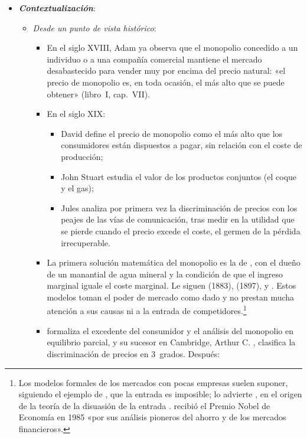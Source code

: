 \documentclass[11pt]{article}
\begin{document}
\begin{itemize}
\item \textbf{\emph{Contextualización}}:
  \begin{itemize}
  \item \emph{Desde un punto de vista histórico}:
  \begin{itemize}
  \item En el siglo XVIII, Adam \textcite{Smith1776Wealth} ya observa que el monopolio concedido a un individuo o a una compañía comercial mantiene el mercado desabastecido para vender muy por encima del precio natural: «el precio de monopolio es, en toda ocasión, el más alto que se puede obtener» (libro~I, cap.~VII).
  \item En el siglo XIX:
    \begin{itemize}
    \item David \textcite{Ricardo1817Principles} define el precio de monopolio como el más alto que los consumidores están dispuestos a pagar, sin relación con el coste de producción;
    \item John Stuart \textcite{Mill1848Principles} estudia el valor de los productos conjuntos (el coque y el gas);
    \item Jules \textcite{Dupuit1849Peages} analiza por primera vez la discriminación de precios con los peajes de las vías de comunicación\nocite{Ekelund1970Price}, tras medir en \textcite{Dupuit1844Mesure} la utilidad que se pierde cuando el precio excede el coste, el germen de la pérdida irrecuperable.
    \end{itemize}
  \item La primera solución matemática del monopolio es la de \textcite{Cournot1838Recherches}, con el dueño de un manantial de agua mineral y la condición de que el ingreso marginal iguale el coste marginal. Le siguen  (1883),  (1897), \textcite{Hotelling1929Stability} y \textcite{Robinson1933Economics}. Estos modelos toman el poder de mercado como dado y no prestan mucha atención a sus causas ni a la entrada de competidores.\footnote{Los modelos formales de los mercados con pocas empresas suelen suponer, siguiendo el ejemplo de , que la entrada es imposible; lo advierte \textcite{Modigliani1958New}, en el origen de la teoría de la disuasión de la entrada .  recibió el Premio Nobel de Economía en 1985 «por sus análisis pioneros del ahorro y de los mercados financieros»\nocite{Nobel1985Modigliani}.}
  \item \textcite{Marshall1890Principles} formaliza el excedente del consumidor y el análisis del monopolio en equilibrio parcial, y su sucesor en Cambridge, Arthur C. \textcite{Pigou1920Economics}, clasifica la discriminación de precios en 3~grados. Después:

\end{itemize}
\end{itemize}
\end{itemize}
\end{document}
